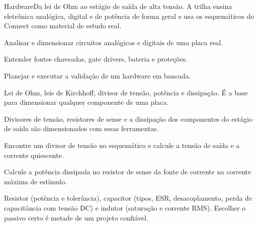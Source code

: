 \begin{parte}{Hardware}{Da lei de Ohm ao estágio de saída de alta tensão. A trilha ensina eletrônica analógica, digital e de potência de forma geral e usa os esquemáticos do Connect como material de estudo real.}
  \item Analisar e dimensionar circuitos analógicos e digitais de uma placa real.
  \item Entender fontes chaveadas, gate drivers, bateria e proteções.
  \item Planejar e executar a validação de um hardware em bancada.
\end{parte}


Lei de Ohm, leis de Kirchhoff, divisor de tensão, potência e dissipação. É a base para dimensionar qualquer componente de uma placa.

\begin{noproduto}
Divisores de tensão, resistores de sense e a dissipação dos componentes do estágio de saída são dimensionados com essas ferramentas.
\end{noproduto}

\begin{paraestudar}
  \item {}
  \item {}
  \item {}
\end{paraestudar}

\begin{pratique}
  \item Encontre um divisor de tensão no esquemático e calcule a tensão de saída e a corrente quiescente.
  \item Calcule a potência dissipada no resistor de sense da fonte de corrente na corrente máxima de estímulo.
\end{pratique}

Resistor (potência e tolerância), capacitor (tipos, ESR, desacoplamento, perda de capacitância com tensão DC) e indutor (saturação e corrente RMS). Escolher o passivo certo é metade de um projeto confiável.

